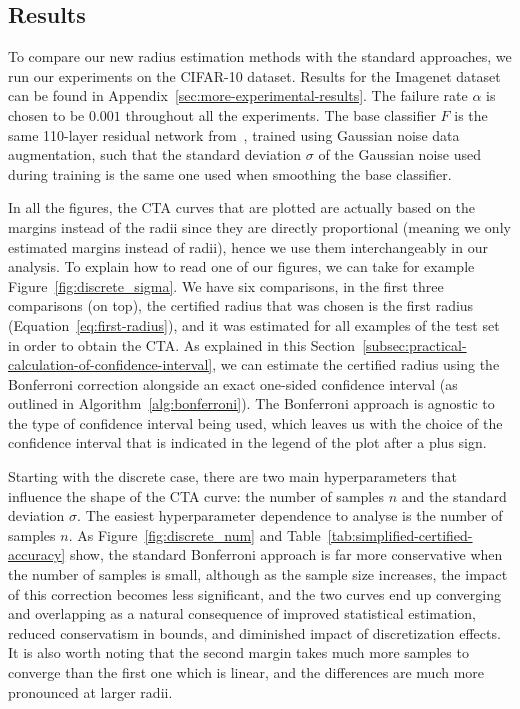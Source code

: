 \subsection{Results}\label{subsec:results}

To compare our new radius estimation methods with the standard approaches, we run our experiments on the CIFAR-10 dataset.
Results for the Imagenet dataset can be found in Appendix~\ref{sec:more-experimental-results}.
The failure rate $\alpha$ is chosen to be $0.001$ throughout all the experiments.
The base classifier $F$ is the same 110-layer residual network from~\citep{cohen2019certified}, trained using Gaussian noise data augmentation, such that the standard deviation $\sigma$ of the Gaussian noise used during training is the same one used when smoothing the base classifier.

In all the figures, the CTA curves that are plotted are actually based on the margins instead of the radii since they are directly proportional (meaning we only estimated margins instead of radii), hence we use them interchangeably in our analysis.
To explain how to read one of our figures, we can take for example Figure~\ref{fig:discrete_sigma}.
We have six comparisons, in the first three comparisons (on top), the certified radius that was chosen is the first radius (Equation~\eqref{eq:first-radius}), and it was estimated for all examples of the test set in order to obtain the CTA.
As explained in this Section~\ref{subsec:practical-calculation-of-confidence-interval}, we can estimate the certified radius using the Bonferroni correction alongside an exact one-sided confidence interval (as outlined in Algorithm~\ref{alg:bonferroni}).
The Bonferroni approach is agnostic to the type of confidence interval being used, which leaves us with the choice of the confidence interval that is indicated in the legend of the plot after a plus sign.


Starting with the discrete case, there are two main hyperparameters that influence the shape of the CTA curve: the number of samples $n$ and the standard deviation $\sigma$.
The easiest hyperparameter dependence to analyse is the number of samples $n$.
As Figure~\ref{fig:discrete_num} and Table~\ref{tab:simplified-certified-accuracy} show, the standard Bonferroni approach is far more conservative when the number of samples is small, although as the sample size increases, the impact of this correction becomes less significant, and the two curves end up converging and overlapping as a natural consequence of improved statistical estimation, reduced conservatism in bounds, and diminished impact of discretization effects.
It is also worth noting that the second margin takes much more samples to converge than the first one which is linear, and the differences are much more pronounced at larger radii.

